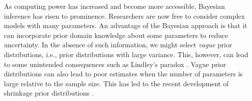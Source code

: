 \documentclass[12pt]{article}
\begin{document}
As computing power has increased and become more accessible, Bayesian inference has risen to prominence.  Researchers are now free to consider complex models with many parameters.  An advantage of the Bayesian approach is that it can incorporate prior domain knowledge about some parameters to reduce uncertainty.
In the absence of such information, we might select {\it vague} prior distributions, i.e., prior distributions with large variance. This, however, can lead to some unintended consequences such as Lindley's paradox \citep{lindley1957}. Vague prior distributions can also lead to poor estimates when the number of parameters is large relative to the sample size. This has led to the recent development of  shrinkage prior distributions \citep{george1993, rovckova2018, park2008, hans2009, carvalho2010, bhadra2017, bhattacharya2015, zhang2022bayesian}.
\end{document}
